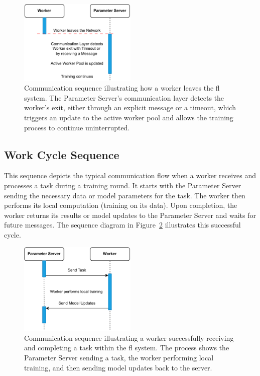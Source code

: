 \begin{figure}[!htb]
    \centering
    \includegraphics[width=0.5\textwidth]{figs/worker_leaves.pdf}
    \caption[Worker Leaves Sequence in Federated Learning]{Communication sequence illustrating how a worker leaves the \ac{fl} system. The Parameter Server's communication layer detects the worker's exit, either through an explicit message or a timeout, which triggers an update to the active worker pool and allows the training process to continue uninterrupted.}
    \label{fig:seq:worker_leaves}
\end{figure}


\subsection{Work Cycle Sequence}

This sequence depicts the typical communication flow when a worker receives and processes a task during a training round. It starts with the Parameter Server sending the necessary data or model parameters for the task. The worker then performs its local computation (training on its data). Upon completion, the worker returns its results or model updates to the Parameter Server and waits for future messages. The sequence diagram in Figure~\ref{fig:seq:worker_works} illustrates this successful cycle.

\begin{figure}[!htb]
    \centering
    \includegraphics[width=0.5\textwidth]{figs/worker_works.pdf}
    \caption[Worker Task Completion Sequence]{Communication sequence illustrating a worker successfully receiving and completing a task within the \ac{fl} system. The process shows the Parameter Server sending a task, the worker performing local training, and then sending model updates back to the server.}
    \label{fig:seq:worker_works}
\end{figure}

